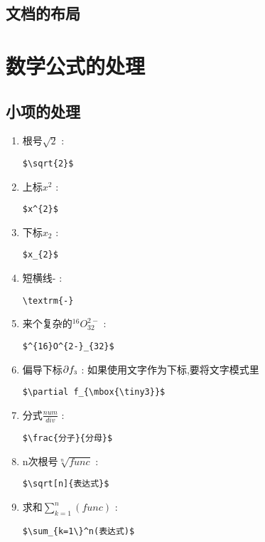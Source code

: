 \documentclass[11pt,a4paper,UTF8,openany]{ctexbook}
\begin{document}
\section{文档的布局}



\chapter{数学公式的处理}
\section{小项的处理}
\begin{enumerate}
\item 根号$\sqrt{2}$ : \begin{verbatim}$\sqrt{2}$\end{verbatim}
\item 上标$x^{2}$ : \begin{verbatim}$x^{2}$\end{verbatim}
\item 下标$x_{2}$ : \begin{verbatim}$x_{2}$\end{verbatim}
\item 短横线\textrm{-} : \begin{verbatim}\textrm{-}\end{verbatim}
\item 来个复杂的$^{16}O^{2-}_{32}$ : \begin{verbatim}$^{16}O^{2-}_{32}$\end{verbatim}
\item 偏导下标$\partial f_{\mbox{\tiny3}}$ : 如果使用文字作为下标,要将文字模式里
\begin{verbatim}$\partial f_{\mbox{\tiny3}}$\end{verbatim}
\item 分式$\frac{num}{div}$ : \begin{verbatim}$\frac{分子}{分母}$\end{verbatim}
\item n次根号$\sqrt[n]{func}$ : \begin{verbatim}$\sqrt[n]{表达式}$\end{verbatim}
\item 求和$\sum_{k=1}^n(func)$ : \begin{verbatim}$\sum_{k=1\}^n(表达式)$\end{verbatim}

\end{enumerate}
\end{document}
